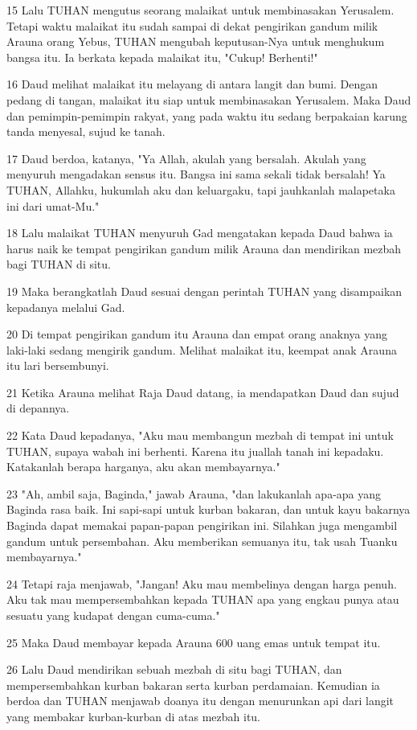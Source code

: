\par 15 Lalu TUHAN mengutus seorang malaikat untuk membinasakan Yerusalem. Tetapi waktu malaikat itu sudah sampai di dekat pengirikan gandum milik Arauna orang Yebus, TUHAN mengubah keputusan-Nya untuk menghukum bangsa itu. Ia berkata kepada malaikat itu, "Cukup! Berhenti!"
\par 16 Daud melihat malaikat itu melayang di antara langit dan bumi. Dengan pedang di tangan, malaikat itu siap untuk membinasakan Yerusalem. Maka Daud dan pemimpin-pemimpin rakyat, yang pada waktu itu sedang berpakaian karung tanda menyesal, sujud ke tanah.
\par 17 Daud berdoa, katanya, "Ya Allah, akulah yang bersalah. Akulah yang menyuruh mengadakan sensus itu. Bangsa ini sama sekali tidak bersalah! Ya TUHAN, Allahku, hukumlah aku dan keluargaku, tapi jauhkanlah malapetaka ini dari umat-Mu."
\par 18 Lalu malaikat TUHAN menyuruh Gad mengatakan kepada Daud bahwa ia harus naik ke tempat pengirikan gandum milik Arauna dan mendirikan mezbah bagi TUHAN di situ.
\par 19 Maka berangkatlah Daud sesuai dengan perintah TUHAN yang disampaikan kepadanya melalui Gad.
\par 20 Di tempat pengirikan gandum itu Arauna dan empat orang anaknya yang laki-laki sedang mengirik gandum. Melihat malaikat itu, keempat anak Arauna itu lari bersembunyi.
\par 21 Ketika Arauna melihat Raja Daud datang, ia mendapatkan Daud dan sujud di depannya.
\par 22 Kata Daud kepadanya, "Aku mau membangun mezbah di tempat ini untuk TUHAN, supaya wabah ini berhenti. Karena itu juallah tanah ini kepadaku. Katakanlah berapa harganya, aku akan membayarnya."
\par 23 "Ah, ambil saja, Baginda," jawab Arauna, "dan lakukanlah apa-apa yang Baginda rasa baik. Ini sapi-sapi untuk kurban bakaran, dan untuk kayu bakarnya Baginda dapat memakai papan-papan pengirikan ini. Silahkan juga mengambil gandum untuk persembahan. Aku memberikan semuanya itu, tak usah Tuanku membayarnya."
\par 24 Tetapi raja menjawab, "Jangan! Aku mau membelinya dengan harga penuh. Aku tak mau mempersembahkan kepada TUHAN apa yang engkau punya atau sesuatu yang kudapat dengan cuma-cuma."
\par 25 Maka Daud membayar kepada Arauna 600 uang emas untuk tempat itu.
\par 26 Lalu Daud mendirikan sebuah mezbah di situ bagi TUHAN, dan mempersembahkan kurban bakaran serta kurban perdamaian. Kemudian ia berdoa dan TUHAN menjawab doanya itu dengan menurunkan api dari langit yang membakar kurban-kurban di atas mezbah itu.
